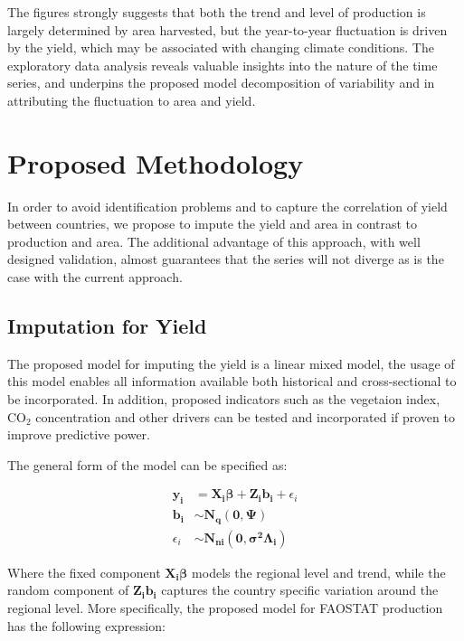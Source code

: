 \documentclass[nojss]{jss}\usepackage{graphicx, color}
\begin{document}
The figures strongly suggests that both the trend and level of 
production is largely determined by  area harvested, but the
year-to-year fluctuation is driven by the yield, which may be
associated with changing climate conditions. The exploratory data analysis
reveals valuable insights into the nature of the time series, and
underpins the proposed model decomposition of variability and in
attributing the fluctuation to area and yield.





\section{Proposed Methodology}
In order to avoid identification problems and to capture the
correlation of yield between countries, we propose to impute the yield
and area in contrast to production and area. The additional advantage
of this approach, with well designed validation, almost guarantees
that the series will not diverge as is the case with the current
approach.


\subsection{Imputation for Yield}
The proposed model for imputing the yield is a linear mixed model, the
usage of this model enables all information available both
historical and cross-sectional to be incorporated. In addition,
proposed indicators such as the vegetaion index, $\text{CO}_2$
concentration and other drivers can be tested and incorporated if
proven to improve predictive power.

The general form of the model can be specified as:

\begin{align}
  \mathbf{y_i} &= \mathbf{X_i}\boldsymbol{\beta} +
  \mathbf{Z_i}\mathbf{b_i} + \epsilon_i \nonumber\\
  \mathbf{b_i} &\sim \mathbf{N_q}(\mathbf{0}, \boldsymbol{\Psi})\nonumber\\
  \epsilon_i &\sim \mathbf{N_{ni}}(\mathbf{0},
  \boldsymbol{\sigma^2}\boldsymbol{\Lambda_i})
\end{align}

Where the fixed component $\mathbf{X_i}\boldsymbol{\beta}$ models the
regional level and trend, while the random component of
$\mathbf{Z_i}\mathbf{b_i}$ captures the country specific variation
around the regional level.  More specifically, the proposed model for
FAOSTAT production has the following expression:
\end{document}
